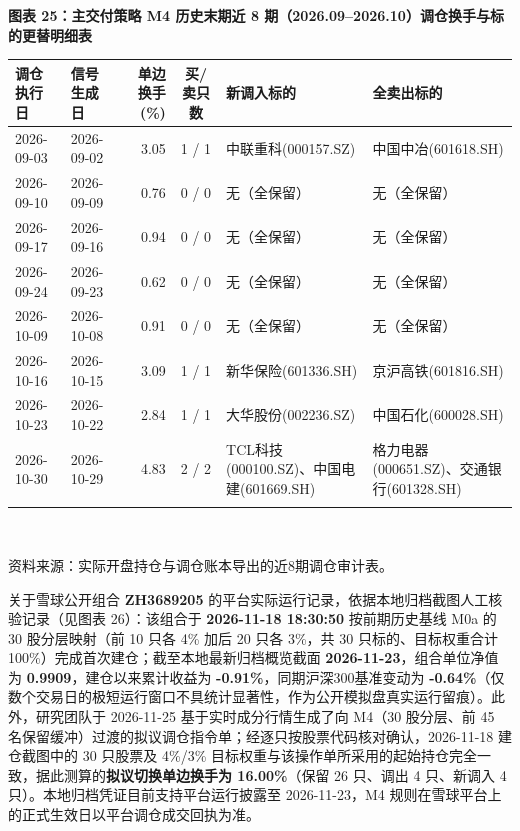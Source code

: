 \documentclass[12pt,a4paper]{article}
\newcommand{\exhibitcap}[1]{{\sffamily\bfseries\fontsize{9.6pt}{12.5pt}\selectfont\textcolor{Primary}{#1}}\\[2pt]}
\newcommand{\exhibitnote}[1]{{\fontsize{7.5pt}{10pt}\selectfont\color{GrayNote}#1\par}}
\begin{document}
\vspace{4pt}
\noindent\begin{minipage}{\textwidth}
\setlength{\parindent}{0pt}\setlength{\tabcolsep}{3.8pt}
\exhibitcap{图表 25：主交付策略 M4 历史末期近 8 期（2026.09--2026.10）调仓换手与标的更替明细表}
\fontsize{7.7pt}{10.4pt}\selectfont
\begin{tabularx}{\textwidth}{@{}l l r c X X@{}}
  \arrayrulecolor{Primary}\toprule[1.0pt]
  \rowcolor{TblHdr}
  \textbf{\sffamily 调仓执行日} & \textbf{\sffamily 信号生成日} & \textbf{\sffamily 单边换手(\%)} & \textbf{\sffamily 买/卖只数} & \textbf{\sffamily 新调入标的} & \textbf{\sffamily 全卖出标的} \\
  \midrule[0.5pt]
    2026-09-03 & 2026-09-02 & 3.05 & 1 / 1 & 中联重科(000157.SZ) & 中国中冶(601618.SH) \\
    2026-09-10 & 2026-09-09 & 0.76 & 0 / 0 & 无（全保留） & 无（全保留） \\
    2026-09-17 & 2026-09-16 & 0.94 & 0 / 0 & 无（全保留） & 无（全保留） \\
    2026-09-24 & 2026-09-23 & 0.62 & 0 / 0 & 无（全保留） & 无（全保留） \\
    2026-10-09 & 2026-10-08 & 0.91 & 0 / 0 & 无（全保留） & 无（全保留） \\
    2026-10-16 & 2026-10-15 & 3.09 & 1 / 1 & 新华保险(601336.SH) & 京沪高铁(601816.SH) \\
    2026-10-23 & 2026-10-22 & 2.84 & 1 / 1 & 大华股份(002236.SZ) & 中国石化(600028.SH) \\
    2026-10-30 & 2026-10-29 & 4.83 & 2 / 2 & TCL科技(000100.SZ)、中国电建(601669.SH) & 格力电器(000651.SZ)、交通银行(601328.SH) \\
  \arrayrulecolor{Primary}\bottomrule[1.0pt]
\end{tabularx}\\[3pt]
\exhibitnote{资料来源：实际开盘持仓与调仓账本导出的近8期调仓审计表。}
\end{minipage}
\vspace{5pt}

关于雪球公开组合 \textbf{ZH3689205} 的平台实际运行记录，依据本地归档截图人工核验记录（见图表 26）：该组合于 \textbf{2026-11-18 18:30:50} 按前期历史基线 M0a 的 30 股分层映射（前 10 只各 4\% 加后 20 只各 3\%，共 30 只标的、目标权重合计 100\%）完成首次建仓；截至本地最新归档概览截面 \textbf{2026-11-23}，组合单位净值为 \textbf{0.9909}，建仓以来累计收益为 \textbf{-0.91\%}，同期沪深300基准变动为 \textbf{-0.64\%}（仅数个交易日的极短运行窗口不具统计显著性，作为公开模拟盘真实运行留痕）。此外，研究团队于 2026-11-25 基于实时成分行情生成了向 M4（30 股分层、前 45 名保留缓冲）过渡的拟议调仓指令单；经逐只按股票代码核对确认，2026-11-18 建仓截图中的 30 只股票及 4\%/3\% 目标权重与该操作单所采用的起始持仓完全一致，据此测算的\textbf{拟议切换单边换手为 16.00\%}（保留 26 只、调出 4 只、新调入 4 只）。本地归档凭证目前支持平台运行披露至 2026-11-23，M4 规则在雪球平台上的正式生效日以平台调仓成交回执为准。
\end{document}
